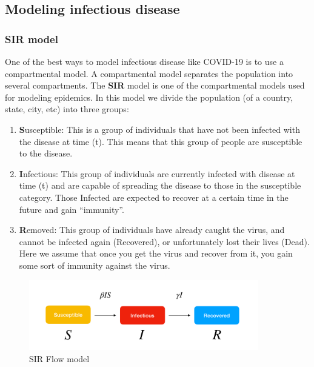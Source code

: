\documentclass[11pt]{article}
\begin{document}
\subsection{Modeling infectious disease}
\subsubsection{SIR model}
One of the best ways to model infectious disease like COVID-19 is to use a compartmental model. A compartmental model separates the population into several compartments. The \textbf{SIR} model is one of the compartmental models used for modeling epidemics. In this model we divide the population (of a country, state, city, etc) into three groups:
\begin{enumerate}
    \item \textbf{S}usceptible: This is a group of individuals that have not been infected with the disease at time (t). This means that this group of people are susceptible to the disease.
    \item\textbf{I}nfectious: This group of individuals are currently infected with disease at time (t) and are capable of spreading the disease to those in the susceptible category. Those Infected are expected to recover at a certain time in the future and gain “immunity”.
    \item \textbf{R}emoved: This group of individuals have already caught the virus, and cannot be infected again (Recovered), or unfortunately lost their lives (Dead). Here we assume that once you get the virus and recover from it, you gain some sort of immunity against the virus.
\end{enumerate}

\begin{figure}[h]
\includegraphics[width=10cm]{images/sir.png}
\centering
\caption{SIR Flow model \cite{sir-model-flow}}
\label{fig:sir-flow}
\end{figure}
\end{document}
